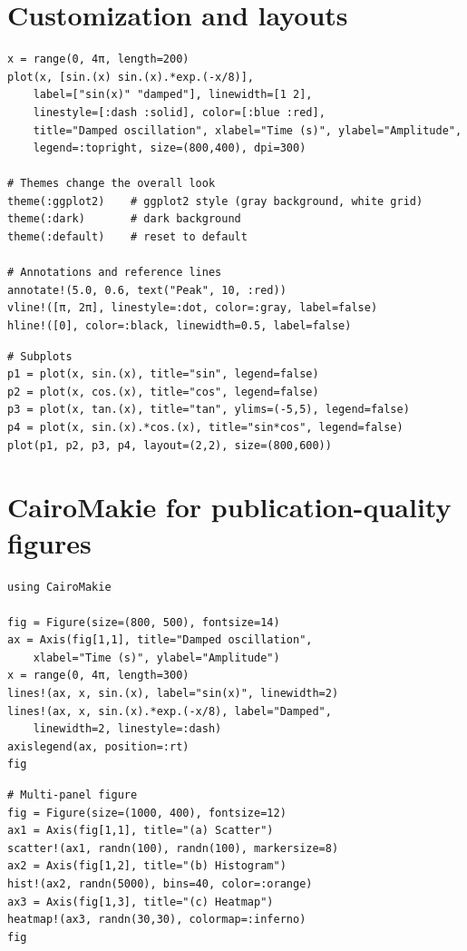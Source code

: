 \section{Customization and layouts}

\begin{verbatim}
x = range(0, 4π, length=200)
plot(x, [sin.(x) sin.(x).*exp.(-x/8)],
    label=["sin(x)" "damped"], linewidth=[1 2],
    linestyle=[:dash :solid], color=[:blue :red],
    title="Damped oscillation", xlabel="Time (s)", ylabel="Amplitude",
    legend=:topright, size=(800,400), dpi=300)

# Themes change the overall look
theme(:ggplot2)    # ggplot2 style (gray background, white grid)
theme(:dark)       # dark background
theme(:default)    # reset to default

# Annotations and reference lines
annotate!(5.0, 0.6, text("Peak", 10, :red))
vline!([π, 2π], linestyle=:dot, color=:gray, label=false)
hline!([0], color=:black, linewidth=0.5, label=false)
\end{verbatim}

\begin{verbatim}
# Subplots
p1 = plot(x, sin.(x), title="sin", legend=false)
p2 = plot(x, cos.(x), title="cos", legend=false)
p3 = plot(x, tan.(x), title="tan", ylims=(-5,5), legend=false)
p4 = plot(x, sin.(x).*cos.(x), title="sin*cos", legend=false)
plot(p1, p2, p3, p4, layout=(2,2), size=(800,600))
\end{verbatim}

\section{CairoMakie for publication-quality figures}

\begin{verbatim}
using CairoMakie

fig = Figure(size=(800, 500), fontsize=14)
ax = Axis(fig[1,1], title="Damped oscillation",
    xlabel="Time (s)", ylabel="Amplitude")
x = range(0, 4π, length=300)
lines!(ax, x, sin.(x), label="sin(x)", linewidth=2)
lines!(ax, x, sin.(x).*exp.(-x/8), label="Damped",
    linewidth=2, linestyle=:dash)
axislegend(ax, position=:rt)
fig
\end{verbatim}

\begin{verbatim}
# Multi-panel figure
fig = Figure(size=(1000, 400), fontsize=12)
ax1 = Axis(fig[1,1], title="(a) Scatter")
scatter!(ax1, randn(100), randn(100), markersize=8)
ax2 = Axis(fig[1,2], title="(b) Histogram")
hist!(ax2, randn(5000), bins=40, color=:orange)
ax3 = Axis(fig[1,3], title="(c) Heatmap")
heatmap!(ax3, randn(30,30), colormap=:inferno)
fig
\end{verbatim}

